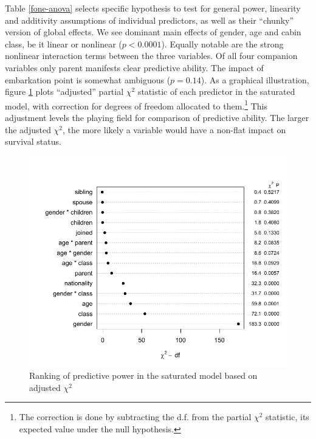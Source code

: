 \documentclass[]{interact}
\theoremstyle{plain}%
\theoremstyle{definition}
\theoremstyle{remark}
\begin{document}
Table \ref{fone-anova} selects specific hypothesis to test for general power, linearity and additivity assumptions of individual predictors, as well as their ``chunky'' version of global effects. We see dominant main effects of gender, age and cabin class, be it linear or nonlinear (\(p < 0.0001\)). Equally notable are the strong nonlinear interaction terms between the three variables. Of all four companion variables only parent manifests clear predictive ability. The impact of embarkation point is somewhat ambiguous (\(p = 0.14\)). As a graphical illustration, figure \ref{fig:fone-anova-plot} plots ``adjusted'' partial \(\chi^2\) statistic of each predictor in the saturated model, with correction for degrees of freedom allocated to them.\footnote{The correction is done by subtracting the d.f. from the partial \(\chi^2\) statistic, its expected value under the null hypothesis.} This adjustment levels the playing field for comparison of predictive ability. The larger the adjusted \(\chi^2\), the more likely a variable would have a non-flat impact on survival status.

\begin{figure}[h]

{\centering \includegraphics{titanic-survival_files/figure-latex/fone-anova-plot-1} 

}

\caption{Ranking of predictive power in the saturated model based on adjusted \(\chi^2\)}\label{fig:fone-anova-plot}
\end{figure}
\end{document}
